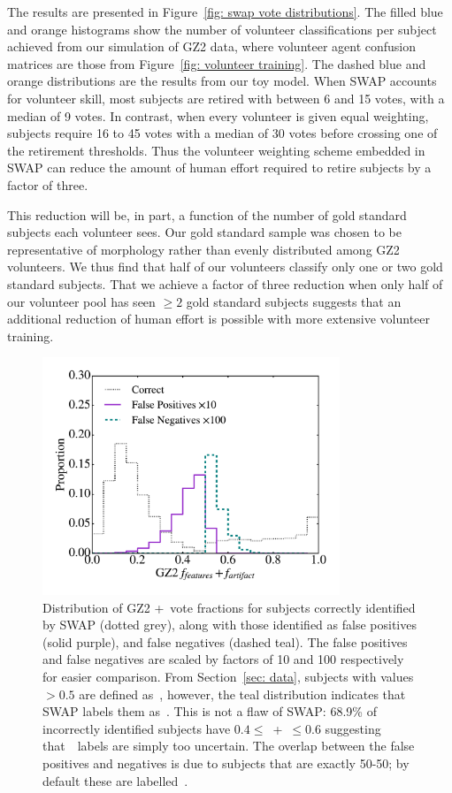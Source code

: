 The results are presented in Figure~\ref{fig: swap vote distributions}. 
The filled blue and orange histograms show the number of volunteer classifications 
per subject achieved from our simulation of GZ2 data, where volunteer agent confusion
 matrices are those from Figure~\ref{fig: volunteer training}. The dashed blue 
and orange distributions are the results from our toy model. When SWAP accounts 
for volunteer skill, most subjects are retired with between 6 and 15 votes, with 
a median of 9 votes. In contrast, when every volunteer is given equal weighting, 
subjects require 16 to 45 votes with a median of 30 votes before crossing one of 
the retirement thresholds. Thus the volunteer weighting scheme embedded in 
SWAP can reduce the amount of human effort required to retire subjects by a factor of three.

This reduction will be, in part, a function of the number of gold standard 
subjects each volunteer sees.  Our gold standard sample was chosen to be 
representative of morphology rather than evenly distributed among GZ2 volunteers. 
We thus find that half of our volunteers classify only one or two gold standard subjects. 
That we achieve a factor of three reduction when only half of our volunteer pool 
has seen $\ge 2$ gold standard subjects suggests that an additional reduction of
  human effort is possible with more extensive volunteer training.

\begin{figure}[t!]
\includegraphics[width=3.5in]{Figures/human_machine/f5.pdf}
\caption[$f_{featured}$ distribution of SWAP misclassifications]{Distribution of GZ2 \ffeat+\fstar~vote fractions for subjects correctly identified by SWAP (dotted grey), along with those identified as false positives (solid purple), and false negatives (dashed teal). 
The false positives and false negatives are scaled by factors of 10 and 100 respectively for easier comparison. From Section~\ref{sec: data}, subjects with values $> 0.5$ are defined as~\feat, however, the teal distribution indicates that SWAP labels them as~\notfeat. This is not a flaw of SWAP: 68.9\% of incorrectly identified subjects have $0.4 \le $~\ffeat +\fstar~$ \le 0.6$ suggesting that~\raw~labels are simply too uncertain. The overlap between the false positives and negatives is due to subjects that are exactly 50-50; by default these are labelled~\notfeat. \label{fig: SWAP sucks}}
\end{figure}


